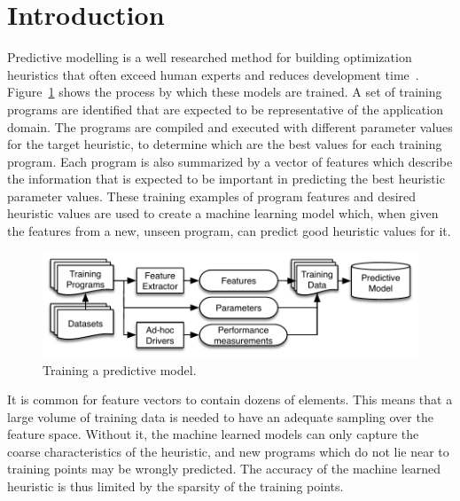 \section{Introduction}

Predictive modelling is a well researched method for building optimization heuristics that often exceed human experts and reduces development time~\cite{Micolet2016,Wang2014c,Magni2014,Cummins2016,Wang2009,Wen2015,Wang2010,Falch2015,Collins2012,Leather2014,Ogilvie2014a}. Figure~\ref{fig:training-a-predictive-model} shows the process by which these models are trained. A set of training programs are identified that are expected to be representative of the application domain. The programs are compiled and executed with different parameter values for the target heuristic, to determine which are the best values for each training program. Each program is also summarized by a vector of features which describe the information that is expected to be important in predicting the best heuristic parameter values. These training examples of program features and desired heuristic values are used to create a machine learning model which, when given the features from a new, unseen program, can predict good heuristic values for it.

\begin{figure}
  \includegraphics[width=\columnwidth]{img/overview-a}%
  \caption{Training a predictive model.}%
  \label{fig:training-a-predictive-model}
\end{figure}

It is common for feature vectors to contain dozens of elements. This means that a large volume of training data is needed to have an adequate sampling over the feature space. Without it, the machine learned models can only capture the coarse characteristics of the heuristic, and new programs which do not lie near to training points may be wrongly predicted. The accuracy of the machine learned heuristic is thus limited by the sparsity of the training points.

